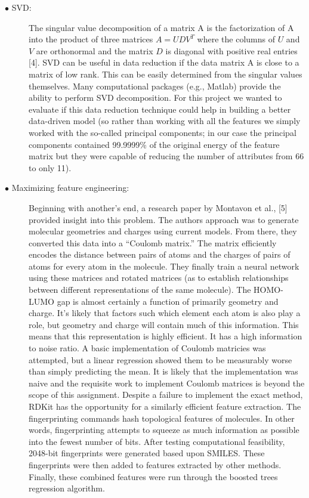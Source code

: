 \documentclass{article}
\begin{document}
\begin{description}
\item[\hspace{0.75cm}$\bullet$ SVD:] The singular value decomposition of a matrix A is the factorization of A into the product of three matrices $A = UDV^T$ where the columns of $U$ and $V$ are orthonormal and the matrix $D$ is diagonal with positive real entries [4]. SVD can be useful in data reduction if the data matrix A is close to a matrix of low rank. This can be easily determined from the singular values themselves. Many computational packages (e.g., Matlab) provide the ability to perform SVD decomposition. For this project we wanted to evaluate if this data reduction technique could help in building a better data-driven model (so rather than working with all the features we simply worked with the so-called principal components; in our case the principal components contained 99.9999\% of the original energy of the feature matrix but they were capable of reducing the number of attributes from 66 to only 11). 

\item[\hspace{0.75cm}$\bullet$ Maximizing feature engineering:] Beginning with another's end, a research paper by Montavon et al., [5] provided insight into this problem. The authors approach was to generate molecular geometries and charges using current models. From there, they converted this data into a “Coulomb matrix.” The matrix efficiently encodes the distance between pairs of atoms and the charges of pairs of atoms for every atom in the molecule. They finally train a neural network using these matrices and rotated matrices (as to establish relationships between different representations of the same molecule). The HOMO-LUMO gap is almost certainly a function of primarily geometry and charge. It's likely that factors such which element each atom is also play a role, but geometry and charge will contain much of this information. This means that this representation is highly efficient. It has a high information to noise ratio. A basic implementation of Coulomb matricies was attempted, but a linear regression showed them to be measurably worse than simply predicting the mean. It is likely that the implementation was naive and the requisite work to implement Coulomb matrices is beyond the scope of this assignment. Despite a failure to implement the exact method, RDKit has the opportunity for a similarly efficient feature extraction. The fingerprinting commands hash topological features of molecules. In other words, fingerprinting attempts to squeeze as much information as possible into the fewest number of bits. After testing computational feasibility, 2048-bit fingerprints were generated based upon SMILES. These fingerprints were then added to features extracted by other methods. Finally, these combined features were run through the boosted trees regression algorithm.


\end{description}
\end{document}
